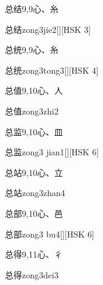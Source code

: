 \begin{Entry}{总结}{9,9}{⼼、⽷}
  \begin{Phonetics}{总结}{zong3jie2}[][HSK 3]
  \end{Phonetics}
\end{Entry}

\begin{Entry}{总统}{9,9}{⼼、⽷}
  \begin{Phonetics}{总统}{zong3tong3}[][HSK 4]
  \end{Phonetics}
\end{Entry}

\begin{Entry}{总值}{9,10}{⼼、⼈}
  \begin{Phonetics}{总值}{zong3zhi2}
  \end{Phonetics}
\end{Entry}

\begin{Entry}{总监}{9,10}{⼼、⽫}
  \begin{Phonetics}{总监}{zong3 jian1}[][HSK 6]
  \end{Phonetics}
\end{Entry}

\begin{Entry}{总站}{9,10}{⼼、⽴}
  \begin{Phonetics}{总站}{zong3zhan4}
  \end{Phonetics}
\end{Entry}

\begin{Entry}{总部}{9,10}{⼼、⾢}
  \begin{Phonetics}{总部}{zong3 bu4}[][HSK 6]
  \end{Phonetics}
\end{Entry}

\begin{Entry}{总得}{9,11}{⼼、⼻}
  \begin{Phonetics}{总得}{zong3dei3}
  \end{Phonetics}
\end{Entry}

